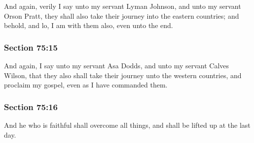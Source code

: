 		And again, verily I say unto my servant Lyman Johnson, and unto my servant Orson Pratt, they shall also take their journey into the eastern countries; and behold, and lo, I am with them also, even unto the end.


	\subsubsection{Section 75:15} %
		\label{DC75-15}

		And again, I say unto my servant Asa Dodds, and unto my servant Calves Wilson, that they also shall take their journey unto the western countries, and proclaim my gospel, even as I have commanded them.


	\subsubsection{Section 75:16} %
		\label{DC75-16}

		And he who is faithful shall overcome all things, and shall be lifted up at the last day.


